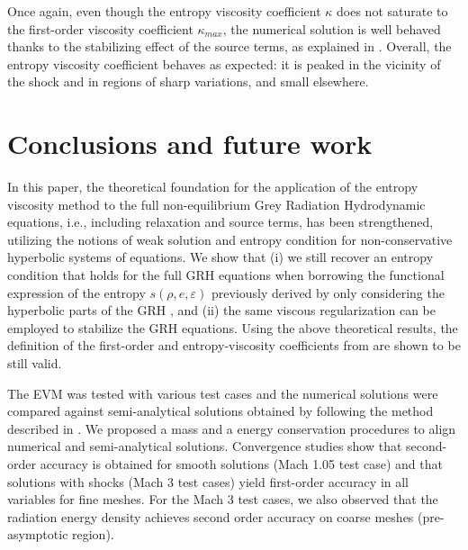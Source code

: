 \documentclass[times,doublespace]{fldauth}%
\begin{document}
Once again, even though the entropy viscosity coefficient $\kappa$ does not saturate to the first-order viscosity coefficient $\kappa_{max}$, the numerical solution is well behaved thanks to the stabilizing effect of the source terms, as explained in .
Overall, the entropy viscosity coefficient behaves as expected: it is peaked in the vicinity of the shock and in regions of sharp variations, and small elsewhere.
%
\section{Conclusions and future work}
In this paper, the theoretical foundation for the application of the entropy viscosity method to the full non-equilibrium Grey Radiation Hydrodynamic equations, i.e., including relaxation and source terms, has been strengthened, utilizing the notions of weak solution and entropy condition for non-conservative hyperbolic systems of equations. We show that 
(i) we still recover an entropy condition that holds for the full GRH equations when borrowing the functional expression of the entropy  $s(\rho,e,\varepsilon)$ previously derived by only considering the hyperbolic parts of the GRH \cite{our_jcp_radhy_paper}, and
(ii) the same viscous regularization can be employed to stabilize the GRH equations.
Using the above theoretical results, the definition of the first-order and entropy-viscosity coefficients from \cite{our_jcp_radhy_paper} are shown to be still valid. 

The EVM was tested with various test cases and the numerical solutions were compared against semi-analytical solutions obtained by following the method described in \cite{LowrieEdwards}. We proposed a mass and a energy conservation procedures to align numerical and semi-analytical solutions. Convergence studies show that second-order accuracy is obtained for smooth solutions (Mach 1.05 test case) and that solutions with shocks (Mach 3 test cases) yield first-order accuracy in all variables for fine meshes. For the Mach 3 test cases, we also observed that the radiation energy density achieves second order accuracy on coarse meshes (pre-asymptotic region).
\end{document}
